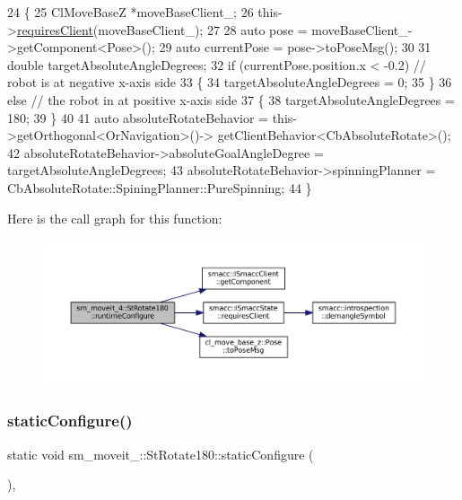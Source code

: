 \begin{DoxyCode}
24     \{
25         ClMoveBaseZ *moveBaseClient\_;
26         this->\hyperlink{classsmacc_1_1ISmaccState_a7f95c9f0a6ea2d6f18d1aec0519de4ac}{requiresClient}(moveBaseClient\_);
27 
28         \textcolor{keyword}{auto} pose = moveBaseClient\_->getComponent<Pose>();
29         \textcolor{keyword}{auto} currentPose = pose->toPoseMsg();
30 
31         \textcolor{keywordtype}{double} targetAbsoluteAngleDegrees;
32         \textcolor{keywordflow}{if} (currentPose.position.x < -0.2) \textcolor{comment}{// robot is at negative x-axis side}
33         \{
34                 targetAbsoluteAngleDegrees = 0;
35         \}
36         \textcolor{keywordflow}{else} \textcolor{comment}{// the robot in at positive x-axis side}
37         \{
38                 targetAbsoluteAngleDegrees = 180;             
39         \}
40 
41         \textcolor{keyword}{auto} absoluteRotateBehavior = this->getOrthogonal<OrNavigation>()->
      getClientBehavior<CbAbsoluteRotate>();
42         absoluteRotateBehavior->absoluteGoalAngleDegree = targetAbsoluteAngleDegrees;
43         absoluteRotateBehavior->spinningPlanner = CbAbsoluteRotate::SpiningPlanner::PureSpinning;
44     \}
\end{DoxyCode}
Here is the call graph for this function\+:
\nopagebreak
\begin{figure}[H]
\begin{center}
\leavevmode
\includegraphics[width=350pt]{structsm__moveit__4_1_1StRotate180_ae75dd5d227f546702062f89c9cada37b_cgraph}
\end{center}
\end{figure}
\mbox{\label{structsm__moveit__4_1_1StRotate180_a53828ab6d27fb2517a6abe72e2c9d7d2}} 
\subsubsection{\texorpdfstring{static\+Configure()}{staticConfigure()}}
{\footnotesize\ttfamily static void sm\+\_\+moveit\+\_\+::\+St\+Rotate180\+::static\+Configure (\begin{DoxyParamCaption}{ }\end{DoxyParamCaption})\hspace{0.3cm}{\ttfamily [inline]}, {\ttfamily [static]}}



